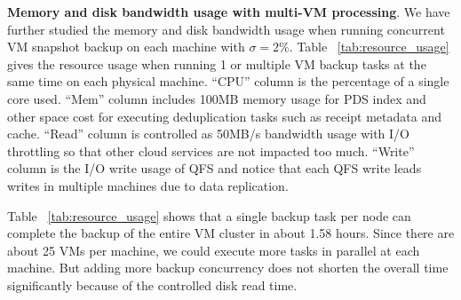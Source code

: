 {\bf Memory and disk bandwidth usage with multi-VM processing}. 
We have further studied the memory and disk bandwidth usage 
when running concurrent VM snapshot backup on each machine with $\sigma=2\%$. 
Table ~\ref{tab:resource_usage} gives the resource usage  when
running 1 or multiple  VM backup tasks at the same time on each physical machine. 
``CPU'' column is the percentage of a single core used. 
``Mem'' column includes 100MB memory usage for PDS index and other space cost for executing deduplication tasks such as 
receipt metadata and cache. 
``Read'' column is controlled as 50MB/s bandwidth usage with I/O throttling so that other cloud services are not impacted too much.
``Write'' column is the I/O write usage of QFS and notice that each QFS write leads writes in multiple machines due to
data replication.     

Table ~\ref{tab:resource_usage} shows that  a single backup task per node can complete the backup of the entire
VM cluster in about 1.58 hours. Since there are about 25 VMs per machine, we could execute
more tasks in parallel at each machine. But adding more backup concurrency does not shorten the overall time
significantly because of the controlled  disk read time.

